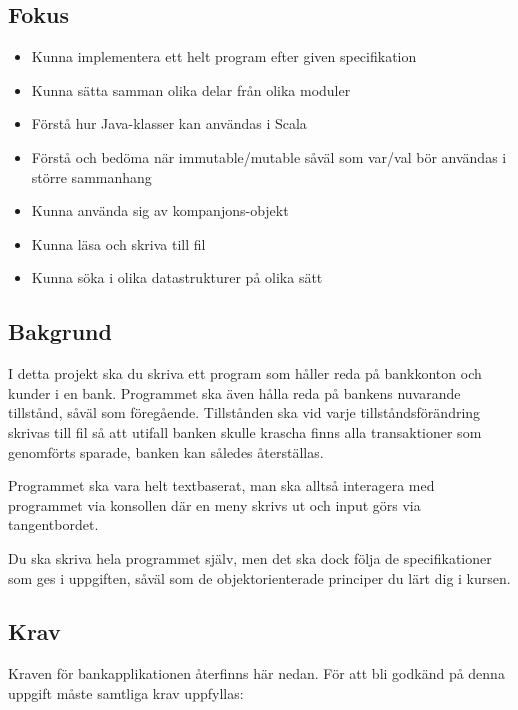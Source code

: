 

\subsection{Fokus}
\begin{itemize}[nosep,label={$\square$},leftmargin=*]
\item Kunna implementera ett helt program efter given specifikation
\item Kunna sätta samman olika delar från olika moduler
\item Förstå hur Java-klasser kan användas i Scala
\item Förstå och bedöma när immutable/mutable såväl som var/val bör användas i större sammanhang
\item Kunna använda sig av kompanjons-objekt
\item Kunna läsa och skriva till fil
\item Kunna söka i olika datastrukturer på olika sätt
\end{itemize}

\subsection{Bakgrund}

I detta projekt ska du skriva ett program som håller reda på bankkonton och kunder i en bank. Programmet ska även hålla reda på bankens nuvarande tillstånd, såväl som föregående.
Tillstånden ska vid varje tillståndsförändring skrivas till fil så att utifall banken skulle krascha finns alla transaktioner som genomförts sparade,  banken kan således återställas.

Programmet ska vara helt textbaserat, man ska alltså interagera med programmet via konsollen där en meny skrivs ut och input görs via tangentbordet.

Du ska skriva hela programmet själv, men det ska dock följa de specifikationer som ges i uppgiften, såväl som de objektorienterade principer du lärt dig i kursen.

\subsection{Krav}

Kraven för bankapplikationen återfinns här nedan. För att bli godkänd på denna uppgift måste samtliga krav uppfyllas:

